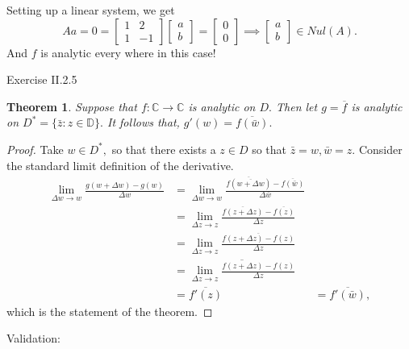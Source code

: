 \documentclass[letter]{article}
\newtheorem{theorem}{Theorem}
\newenvironment{menumerate}{%
  \edef\backupindent{\the\parindent}%
  \enumerate%
  \setlength{\parindent}{\backupindent}%
}{\endenumerate}
\begin{document}
\begin{menumerate}
 	Setting up a linear system, we get 
 	\begin{equation}
 	Aa = 0 = 
 		\begin{bmatrix}
 			1 & 2 \\
 			1 & -1
 		\end{bmatrix}
 		\begin{bmatrix}
 			a \\
 			b
 		\end{bmatrix} =
 		\begin{bmatrix}
 			0 \\ 0
 		\end{bmatrix} \implies
 		\begin{bmatrix}
 			a \\ b
 		\end{bmatrix} \in Nul(A).
 	\end{equation}
 	And $f$ is analytic every where in this case!
 	\item Exercise II.2.5
 	\begin{theorem}
 		Suppose that $f:\mathbb{C} \to \mathbb{C}$ is analytic on $D.$ Then
 		let $g = \overline{f}$ is analytic on $D^* = \{\bar z : z \in \mathbb{D}\}.$ 
 		It follows that, $g'(w) = \overline{f(\bar w)}.$
 	\end{theorem}
 	\begin{proof}
 		Take $w \in D^*,$ so that there exists a $z \in D$ so that $\bar z = w, \bar w = z.$
 		 Consider the standard limit definition of the derivative.
 		\begin{equation}
 			\begin{aligned}
 					\lim_{\Delta w \to w} \frac{g(w + \Delta w) - g(w)}{\Delta w} &= 
					\lim_{\Delta w \to w} \frac{\overline{f(\overline{w + \Delta w})} - \overline{f(\bar w)}}{\Delta \bar w} \\
					&= \lim_{\Delta z \to z} \frac{\overline{f({z + \Delta z})} - \overline{f(z)}}{\Delta z} \\
					&= \lim_{\Delta z \to z} \frac{\overline{f({z + \Delta z}) - f(z)}}{\Delta z} \\
					&= \overline{\lim_{\Delta z \to z} \frac{{f({z + \Delta z}) - f(z)}}{\Delta z}} \\
					&= \overline{f'(z)}
					&= \overline{f'(\bar w)},
 			\end{aligned}
 		\end{equation}
 		which is the statement of the theorem.
 	\end{proof}
 	\item Validation:
 	\begin{equation}

\end{equation}
\end{menumerate}
\end{document}
